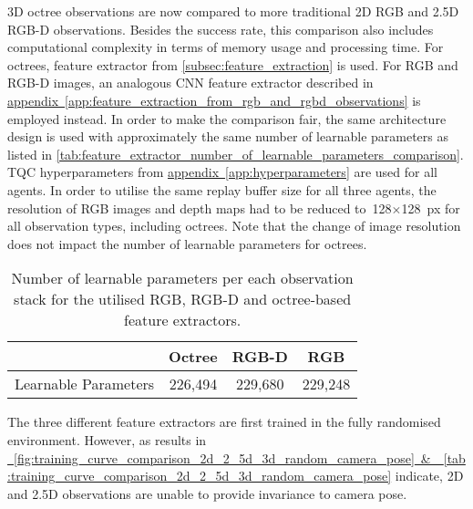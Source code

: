 3D octree observations are now compared to more traditional 2D RGB and 2.5D RGB-D observations. Besides the success rate, this comparison also includes computational complexity in terms of memory usage and processing time. For octrees, feature extractor from \autoref{subsec:feature_extraction} is used. For RGB and RGB-D images, an analogous CNN feature extractor described in \hyperref[app:feature_extraction_from_rgb_and_rgbd_observations]{appendix~\ref*{app:feature_extraction_from_rgb_and_rgbd_observations}} is employed instead.  In order to make the comparison fair, the same architecture design is used with approximately the same number of learnable parameters as listed in \autoref{tab:feature_extractor_number_of_learnable_parameters_comparison}. TQC hyperparameters from \hyperref[app:hyperparameters]{appendix~\ref*{app:hyperparameters}} are used for all agents. In order to utilise the same replay buffer size for all three agents, the resolution of RGB images and depth maps had to be reduced to~128\({\times}\)128~px for all observation types, including octrees. Note that the change of image resolution does not impact the number of learnable parameters for octrees.

\begin{table}[ht]
    \centering
    \begin{tabular}{l|ccc}
                             &
        \textbf{Octree}      & \textbf{RGB-D} & \textbf{RGB}           \\ \hline
        Learnable Parameters & 226,494        & 229,680      & 229,248
    \end{tabular}
    \caption{Number of learnable parameters per each observation stack for the utilised RGB, RGB-D and octree-based feature extractors.}
    \label{tab:feature_extractor_number_of_learnable_parameters_comparison}
\end{table}

The three different feature extractors are first trained in the fully randomised environment. However, as results in \hyperref[fig:training_curve_comparison_2d_2_5d_3d_random_camera_pose]{\figurename~\ref*{fig:training_curve_comparison_2d_2_5d_3d_random_camera_pose}~\&~\tablename~\ref*{tab:training_curve_comparison_2d_2_5d_3d_random_camera_pose}} indicate, 2D and 2.5D observations are unable to provide invariance to camera pose.

